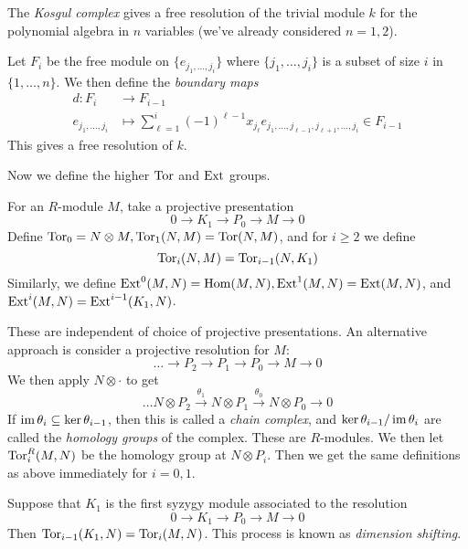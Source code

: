 \documentclass[10pt,a4paper]{article}
\begin{document}
\begin{definition}
  The \emph{Kosgul complex} gives a free resolution of the trivial module $k$ for the polynomial algebra in $n$ variables (we've already considered $n=1,2$).
\end{definition}
Let $F_i$ be the free module on $\{e_{j_1, \ldots, j_i}\}$ where $\{j_1, \ldots, j_i\}$ is a subset of size $i$ in $\{1, \ldots, n\}$. We then define the \emph{boundary maps}
\begin{align*}
  d: F_i &\to F_{i-1}\\
  e_{j_1, \ldots, j_i} &\mapsto \sum_{\ell=1}^i (-1)^{\ell-1}x_{j_\ell} e_{j_1,\ldots, j_{\ell-1}, j_{\ell+1},\ldots, j_i} \in F_{i-1}
\end{align*}
This gives a free resolution of $k$.

Now we define the higher $\operatorname{Tor}$ and $\operatorname{Ext}$ groups.
\begin{definition}
  For an $R$-module $M$, take a projective presentation
  \[0 \to K_1 \to P_0 \to M \to 0\]
  Define $\operatorname{Tor}_0 = N \otimes M, \operatorname{Tor}_1(N,M) = \operatorname{Tor}(N,M)$, and for $i \geq 2$ we define
  \[\operatorname{Tor}_i(N,M) = \operatorname{Tor}_{i-1}(N, K_1)\]
  Similarly, we define $\operatorname{Ext}^0(M,N) = \operatorname{Hom}(M,N), \operatorname{Ext}^1(M,N) = \operatorname{Ext}(M,N)$, and $\operatorname{Ext}^i(M,N) = \operatorname{Ext}^{i-1}(K_1,N)$.
\end{definition}
These are independent of choice of projective presentations. An alternative approach is consider a projective resolution for $M$:
\[ \ldots \to P_2 \to P_1 \to P_0 \to M \to 0\]
We then apply $N \otimes \cdot$ to get
\[\ldots N\otimes P_2 \xrightarrow{\theta_1} N\otimes P_1 \xrightarrow{\theta_0} N \otimes P_0 \to 0\]
If $\operatorname{im} \theta_i \subseteq \ker \theta_{i-1}$, then this is called a \emph{chain complex}, and $\ker \theta_{i-1} / \operatorname{im} \theta_i$ are called the \emph{homology groups} of the complex. These are $R$-modules. We then let $\operatorname{Tor}_i^R(M,N)$ be the homology group at $N \otimes P_i$. Then we get the same definitions as above immediately for $i=0,1$.

Suppose that $K_1$ is the first syzygy module associated to the resolution
\[0 \to K_1 \to P_0 \to M \to 0\]
Then $\operatorname{Tor}_{i-1}(K_1, N) = \operatorname{Tor}_i(M,N)$. This process is known as \emph{dimension shifting}.
\end{document}
